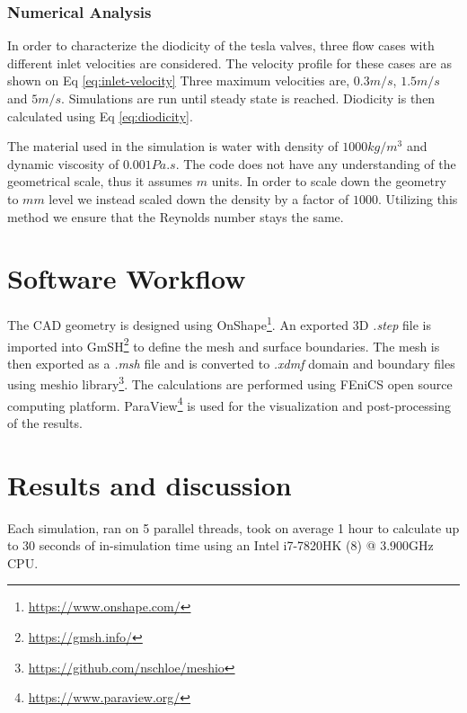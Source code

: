 \documentclass[12pt, letterpaper]{article}
\begin{document}

\subsubsection{Numerical Analysis}
In order to characterize the diodicity of the tesla valves, three flow cases with different inlet velocities are considered. The velocity profile for these cases are as shown on Eq \ref{eq:inlet-velocity} Three maximum velocities are, $0.3 m/s$, $1.5 m/s$ and $5 m/s$. Simulations are run until steady state is reached. Diodicity is then calculated using Eq \ref{eq:diodicity}.

The material used in the simulation is water with density of $1000 kg/m^3$ and dynamic viscosity of $0.001Pa.s$. The code does not have any understanding of the geometrical scale, thus it assumes $m$ units. In order to scale down the geometry to $mm$ level we instead scaled down the density by a factor of $1000$. Utilizing this method we ensure that the Reynolds number stays the same.

\section{Software Workflow}

The CAD geometry is designed using OnShape\footnote{\url{https://www.onshape.com/}}. An exported 3D \textsl{.step} file is imported into GmSH\footnote{\url{https://gmsh.info/}} to define the mesh and surface boundaries. The mesh is then exported as a \textsl{.msh} file and is converted to \textsl{.xdmf} domain and boundary files using meshio library\footnote{\url{https://github.com/nschloe/meshio}}.
The calculations are performed using FEniCS open source computing platform. ParaView\footnote{\url{https://www.paraview.org/}} is used for the visualization and post-processing of the results.

\section{Results and discussion}
Each simulation, ran on 5 parallel threads, took on average 1 hour to calculate up to 30 seconds of in-simulation time using an Intel i7-7820HK (8) @ 3.900GHz CPU.
\end{document}
